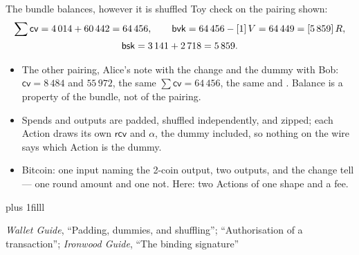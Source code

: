 \documentclass[aspectratio=169,11pt]{beamer}
\newcommand{\cvsym}{\ensuremath{\mathsf{cv}}}
\newcommand{\rcv}{\ensuremath{\mathsf{rcv}}}
\newcommand{\src}[1]{\par\vskip0pt plus 1filll
  {\fontsize{6}{7.2}\selectfont\color{arbdim}\raggedright #1\par}}
\begin{document}
\begin{frame}{The bundle balances, however it is shuffled}
Toy check on the pairing shown:
\begin{gather*}
\sum \cvsym = 4\,014 + 60\,442 = 64\,456, \qquad
\Epbvk = 64\,456 - [1]\,V = 64\,449 = [5\,859]\,R, \\
\Epbsk = 3\,141 + 2\,718 = 5\,859 .
\end{gather*}
\begin{itemize}
\item The other pairing, Alice's note with the change and the dummy
  with Bob: $\cvsym = 8\,484$ and $55\,972$, the same $\sum \cvsym =
  64\,456$, the same \Epbvk{} and \Epbsk. Balance is a property of the
  bundle, not of the pairing.
\item Spends and outputs are padded, shuffled independently, and
  zipped; each Action draws its own \rcv{} and $\alpha$, the dummy
  included, so nothing on the wire says which Action is the dummy.
\item Bitcoin: one input naming the 2-coin output, two outputs, and
  the change tell --- one round amount and one not. Here: two Actions
  of one shape and a fee.
\end{itemize}
\src{\emph{Wallet Guide}, ``Padding, dummies, and shuffling''; ``Authorisation
  of a transaction''; \emph{Ironwood Guide}, ``The binding signature''}
\end{frame}
\end{document}
